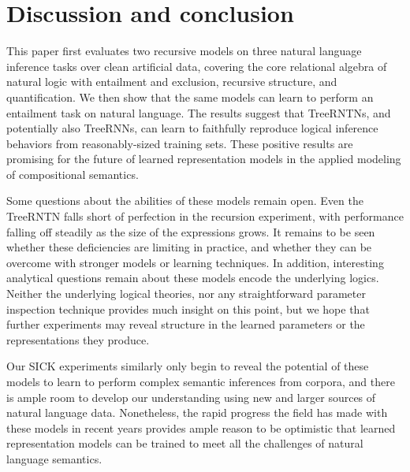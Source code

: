 \section{Discussion and conclusion}\label{sec:discussion}

This paper first evaluates two recursive models on three natural language inference 
tasks over clean artificial data, covering the 
core relational algebra of natural logic with entailment and
exclusion, recursive structure, and quantification. 
We then show that the same models can learn to
perform an entailment task on natural language. The results suggest that TreeRNTNs,
and potentially also TreeRNNs, can learn to faithfully reproduce logical inference behaviors from
reasonably-sized training sets. These positive results are
promising for the future of learned representation models in the
applied modeling of compositional semantics.

Some questions about the abilities of these models remain open. Even
the TreeRNTN falls short of perfection in the recursion experiment, with
performance falling off steadily as the size of the expressions grows. It
remains to be seen whether these deficiencies are limiting in practice,
and whether they can be overcome with
stronger models or learning techniques. In addition, interesting 
analytical questions remain about  these models encode
the underlying logics. Neither the underlying
logical theories, nor any straightforward parameter inspection technique provides 
much insight on this point, but we hope that further experiments may reveal 
structure in the learned parameters or the representations they produce.

Our SICK experiments similarly only begin to reveal the potential of these models to learn to 
perform complex semantic inferences from corpora, and there is ample room to develop our understanding
using new and larger sources of natural language data. Nonetheless, the rapid progress the field 
has made with these models in recent years provides ample reason to be optimistic that 
learned representation models can be trained to
meet all the challenges of natural language semantics.

